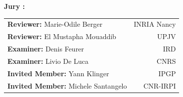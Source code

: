 \begin{titlepage}
\noindent \large \textbf{Jury :} \\
\begin{center}
\begin{tabular}{lr}
\textbf{Reviewer:} Marie-Odile Berger & INRIA Nancy\\
\textbf{Reviewer:} El Mustapha Mouaddib & UPJV\\
\textbf{Examiner:} Denis Feurer & IRD\\
\textbf{Examiner:} Livio De Luca & CNRS\\
\textbf{Invited Member:} Yann Klinger & IPGP\\
\textbf{Invited Member:} Michele Santangelo & CNR-IRPI\\
\end{tabular}

\end{center}
\end{titlepage}

\sloppy

\titlepage

\restoregeometry

